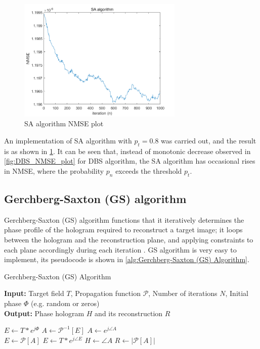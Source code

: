 \begin{figure}[H]
  \centering
  \includegraphics[width=0.7\textwidth]{SA_NMSE_plot.png}
  \caption{SA algorithm NMSE plot}
  \label{fig:SA_NMSE_plot}
\end{figure}
An implementation of SA algorithm with $p_t = 0.8$ was carried out, and the result is as shown in \cref{fig:SA_NMSE_plot}. It can be seen that, instead of monotonic decrease observed in \cref{fig:DBS_NMSE_plot} for DBS algorithm, the SA algorithm has occasional rises in NMSE, where the probability $p_n$ exceeds the threshold $p_t$.

\subsection{Gerchberg-Saxton (GS) algorithm}\label{sec:Gerchberg-Saxton (GS) Algorithm}
Gerchberg-Saxton (GS) algorithm functions that it iteratively determines the phase profile of the hologram required to reconstruct a target image; it loops between the hologram and the reconstruction plane, and applying constraints to each plane accordingly during each iteration \cite{Gerchberg1972}. GS algorithm is very easy to implement, its pseudocode is shown in \cref{alg:Gerchberg-Saxton (GS) Algorithm}.
\begin{algorithm}[H]
  \caption{Gerchberg-Saxton (GS) Algorithm}\label{alg:Gerchberg-Saxton (GS) Algorithm}
  \textbf{Input:} Target field $T$, Propagation function $\mathcal{P}$, Number of iterations $N$, Initial phase $\varPhi$ (e.g. random or zeros) \\
  \textbf{Output:} Phase hologram $H$ and its reconstruction $R$
  \begin{algorithmic}
    \State $E \gets T * e^{j\varPhi}$
    \State $A \gets \mathcal{P}^{-1}[E]$
    \State $A \gets e^{j\angle A}$\\
    \State $E \gets \mathcal{P}[A]$
    \State $E \gets T * e^{j\angle E}$
    \EndFor
    \State $H \gets \angle A$
    \State $R \gets \vert \mathcal{P}[A] \vert$
  \end{algorithmic}
\end{algorithm}

